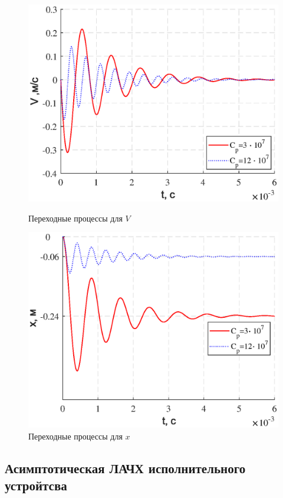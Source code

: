 \documentclass[a4paper,12pt]{article}
\begin{document}
			\begin{figure}[h!]
				\begin{center}
					\begin{minipage}[h]{0.45\linewidth}
						\renewcommand{\figurename}{Рисунок}
						\includegraphics[width=1\linewidth]{v_pri_cp.eps}
						\caption{Переходные процессы для $V$} 
						\label{s_5} 
					\end{minipage}
					\hfill 
					\begin{minipage}[h]{0.45\linewidth}
						\renewcommand{\figurename}{Рисунок}
						\includegraphics[width=1\linewidth]{x_pri_cp.eps}
						\caption{Переходные процессы для $x$}
						\label{s_6}
					\end{minipage}
				\end{center}
			\end{figure}	
	\newpage
	\begin{center}
		\section{Асимптотическая ЛАЧХ исполнительного устройтсва}
	\end{center}
\end{document}
